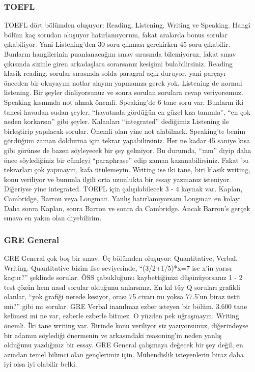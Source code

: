 \documentclass[12pt]{article}
\begin{document}
\subsubsection{TOEFL}
TOEFL dört bölümden oluşuyor: Reading, Listening, Writing ve Speaking. Hangi bölüm kaç sorudan oluşuyor hatırlamıyorum, fakat aralarda bonus sorular çıkabiliyor. Yani Listening’den 30 soru çıkması gerekirken 45 soru çıkabilir. Bunların hangilerinin puanlanacağını sınav sırasında bilemiyoruz, fakat sınav çıkısında sizinle giren arkadaşlara sorarsanız kesişimi bulabilirsiniz. Reading klasik reading, sorular sırasında solda paragraf açık duruyor, yani parçayı önceden bir okuyayım notlar alayım yapmanıza gerek yok. Listening de normal listening. Bir şeyler dinliyorsunuz ve sonra sorulan sorulara cevap veriyorsunuz. Speaking kısmında not almak önemli. Speaking’de 6 tane soru var. Bunların iki tanesi havadan sudan şeyler, “hayatında gördüğün en güzel kızı tanımla”, “en çok neden korkarsın” gibi şeyler. Kalanları “integrated” dediğimiz Listening ile birleştirip yapılacak sorular. Önemli olan yine not alabilmek. Speaking’te benim gördüğüm zaman doldurma için tekrar yapabilirsiniz. Her ne kadar 45 saniye kısa gibi görünse de bazen söyleyecek bir şey gelmiyor. Bu durumda, “mm” diyip daha önce söylediğiniz bir cümleyi “paraphrase” edip zaman kazanabilirsiniz. Fakat bu tekrarları çok yapmayın, kafa ütülemeyin. Writing ise iki tane, biri klasik writing, konu veriliyor ve bununla ilgili orta uzunlukta bir essay yazmanız isteniyor. Diğeriyse yine integrated. TOEFL için çalışılabilecek 3 - 4 kaynak var. Kaplan, Cambridge, Barron veya Longman. Yanlış hatırlamıyorsam Longman en kolayı. Daha sonra Kaplan, sonra Barron ve sonra da Cambridge. Ancak Barron’s gerçek sınava en yakın olan diyebilirim.

\subsubsection{GRE General}
GRE General çok boş bir sınav. Üç bölümden oluşuyor: Quantitative, Verbal, Writing. Quantitative bizim lise seviyesinde, “(3/2+1/5)*x=7 ise x’in yarısı kaçtır?” şeklinde sorular. ÖSS çabukluğunu kaybettiğinizi düşünüyorsanız 1 - 2 test çözün hem nasıl sorular olduğunu anlarsınız. En kıl tüy Q soruları grafikli olanlar, “yok grafiği nerede kesiyor, orası 75 civarı mı yoksa 77.5’un biraz üstü mü?” gibi mi sorular. GRE Verbal inanılmaz ezber isteyen bir bölüm. 3.600 tane kelimesi mi ne var, ezberle ezberle bitmez. O yüzden pek uğraşmayın. Writing önemli. İki tane writing var. Birinde konu veriliyor siz yazıyorsunuz, diğerindeyse bir adamın söylediği önermenin ve arkasındaki reasoning’in neden yanlış olduğunu yazdığınız bir essay. GRE General çalışmaya değecek bir şey değil, en azından temel bilimci olan gençlerimiz için. Mühendislik isteyenlerin biraz daha iyi olsa iyi olabilir belki.
\end{document}
